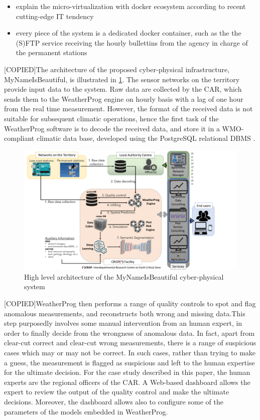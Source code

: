 \documentclass[authoryear,preprint,review,12pt]{elsarticle}
\begin{document}
\begin{itemize}
    \item explain the micro-virtualization with docker ecosystem according to recent cutting-edge IT tendency
    \item every piece of the system is a dedicated docker container, such as the the (S)FTP service receiving the hourly bullettins from the agency in charge of the permanent stations
\end{itemize}

[COPIED]The architecture of the proposed cyber-physical infrastructure, MyNameIsBeautiful, is illustrated in \cref{cyberPhysicalSystemFig}.
The sensor networks on the territory provide input data to the system.
Raw data are collected by the CAR, which sends them to the WeatherProg engine on hourly basis with a lag of one hour from the real time measurement.
However, the format of the received data is not suitable for subsequent climatic operations, hence the first task of the WeatherProg software is to decode the received data, and store it in a WMO-compliant climatic data base, developed using the PostgreSQL relational DBMS \cite{postgres}.

\begin{figure}
	\centering
	\includegraphics[scale=.5]{figures/fullSystem_GCI.pdf}
	\caption{High level architecture of the MyNameIsBeautiful cyber-physical system}
	\label{cyberPhysicalSystemFig}
\end{figure}

[COPIED]WeatherProg then performs a range of quality controls to spot and flag anomalous measurements, and reconstructs both wrong and missing data.This step purposedly involves some manual intervention from an human expert, in order to finally decide from the wrongness of anomalous data. In fact, apart from clear-cut correct and clear-cut wrong measurements, there is a range of suspicious cases which may or may not be correct. In such cases, rather than trying to make a guess, the measurement is flagged as suspicious and left to the human expertise for the ultimate decision. For the case study described in this paper, the human experts are the regional officers of the CAR. A Web-based dashboard allows the expert to review the output of the quality control and make the ultimate decisions. Moreover, the dashboard allows also to configure some of the parameters of the models embedded in WeatherProg.
\end{document}
